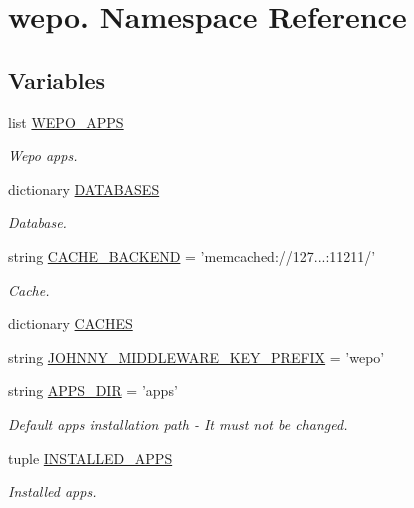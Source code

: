 \hypertarget{namespacewepo_1_1}{\section{wepo. Namespace Reference}
\label{namespacewepo_1_1}
}
\subsection*{Variables}
\begin{DoxyCompactItemize}
\item 
list \hyperlink{namespacewepo_1_1_a3aa6a5c3d50cbdc2d848fde01a99e04c}{W\-E\-P\-O\-\_\-\-A\-P\-P\-S}
\begin{DoxyCompactList}\small\item\em Wepo apps. \end{DoxyCompactList}\item 
dictionary \hyperlink{namespacewepo_1_1_a6ffb857fa446232323e5cbe4f5925789}{D\-A\-T\-A\-B\-A\-S\-E\-S}
\begin{DoxyCompactList}\small\item\em Database. \end{DoxyCompactList}\item 
string \hyperlink{namespacewepo_1_1_a0c59bb49e79b82d0929a67f3613ee05e}{C\-A\-C\-H\-E\-\_\-\-B\-A\-C\-K\-E\-N\-D} = 'memcached\-://127...\-:11211/'
\begin{DoxyCompactList}\small\item\em Cache. \end{DoxyCompactList}\item 
dictionary \hyperlink{namespacewepo_1_1_afa323209f988a07e83cb8ecfe8c80543}{C\-A\-C\-H\-E\-S}
\item 
string \hyperlink{namespacewepo_1_1_aa344a227bb0f3eeb4fc341b87c6cb21d}{J\-O\-H\-N\-N\-Y\-\_\-\-M\-I\-D\-D\-L\-E\-W\-A\-R\-E\-\_\-\-K\-E\-Y\-\_\-\-P\-R\-E\-F\-I\-X} = 'wepo'
\item 
string \hyperlink{namespacewepo_1_1_a4a23b03339977207601d1c5af5129b8e}{A\-P\-P\-S\-\_\-\-D\-I\-R} = 'apps'
\begin{DoxyCompactList}\small\item\em Default apps installation path -\/ It must not be changed. \end{DoxyCompactList}\item 
tuple \hyperlink{namespacewepo_1_1_a4ce781fb51019cb152c126cbc8727e42}{I\-N\-S\-T\-A\-L\-L\-E\-D\-\_\-\-A\-P\-P\-S}
\begin{DoxyCompactList}\small\item\em Installed apps. \end{DoxyCompactList}\item 

\end{DoxyCompactItemize}
